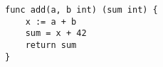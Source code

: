 \begin{lstlisting}[language=Golang, label=lst:stack-example-function, caption=Example function to illustrate Go stack frames]
func add(a, b int) (sum int) {
    x := a + b
    sum = x + 42
    return sum
}
\end{lstlisting}
